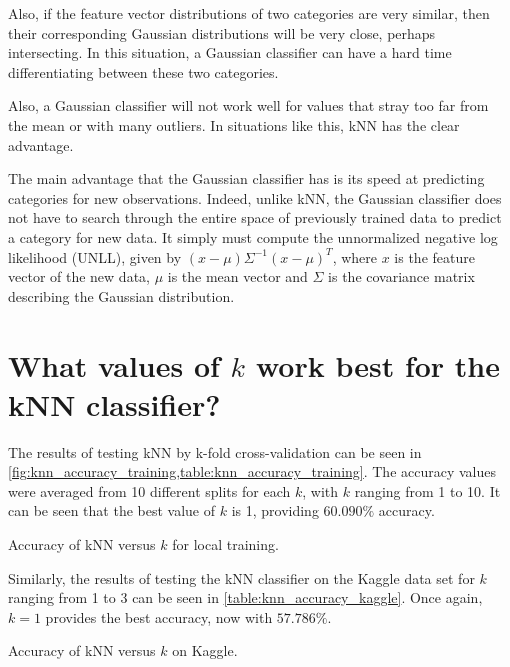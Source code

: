 \documentclass[a4paper,titlepage]{article}
\begin{document}
	Also, if the feature vector distributions of two categories are very similar, then their corresponding Gaussian distributions will be very close, perhaps intersecting. In this situation, a Gaussian classifier can have a hard time differentiating between these two categories.
	
	Also, a Gaussian classifier will not work well for values that stray too far from the mean or with many outliers. In situations like this, kNN has the clear advantage.
	
	The main advantage that the Gaussian classifier has is its speed at predicting categories for new observations. Indeed, unlike kNN, the Gaussian classifier does not have to search through the entire space of previously trained data to predict a category for new data. It simply must compute the unnormalized negative log likelihood (UNLL), given by $(x-\mu)\Sigma^{-1}(x-\mu)^T$, where $x$ is the feature vector of the new data, $\mu$ is the mean vector and $\Sigma$ is the covariance matrix describing the Gaussian distribution.
	
	\section{What values of $k$ work best for the kNN classifier?}

	The results of testing kNN by k-fold cross-validation can be seen in \cref{fig:knn_accuracy_training,table:knn_accuracy_training}. The accuracy values were averaged from 10 different splits for each $k$, with $k$ ranging from 1 to 10. It can be seen that the best value of $k$ is 1, providing $60.090\%$ accuracy.
	
	\begin{table}[!htb]
		\centering
		\caption{Accuracy of kNN versus $k$ for local training.}
		\label{table:knn_accuracy_training}
	\end{table}
	
	Similarly, the results of testing the kNN classifier on the Kaggle data set for $k$ ranging from 1 to 3 can be seen in \cref{table:knn_accuracy_kaggle}. Once again, $k=1$ provides the best accuracy, now with $57.786\%$.
	
	\begin{table}[!htb]
		\centering
		\caption{Accuracy of kNN versus $k$ on Kaggle.}
		\label{table:knn_accuracy_kaggle}
	\end{table}
	
\end{document}
